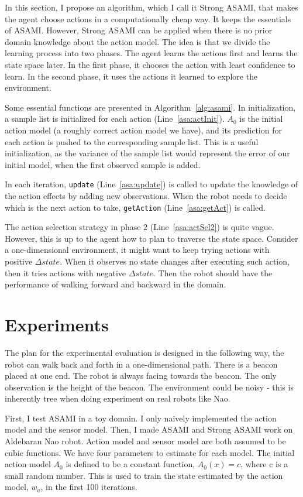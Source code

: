 \documentclass[10pt]{article}
\begin{document}
In this section, I propose an algorithm, which I call it Strong ASAMI,
that makes the agent choose actions in a computationally cheap way.
It keeps the essentials of ASAMI\@. However, Strong ASAMI can be applied
when there is no prior domain knowledge about the action model. The
idea is that we divide the learning process into two phases. The agent
learns the actions first and learns the state space later. In the
first phase, it chooses the action with least confidence to learn. In
the second phase, it uses the actions it learned to explore the
environment.

Some essential functions are presented in Algorithm~\ref{alg:asami}.
In initialization, a sample list is initialized for each action
(Line~\ref{asa:actInit}). $A_0$ is the initial action model (a roughly
correct action model we have), and its prediction for each action is
pushed to the corresponding sample list.  This is a useful
initialization, as the variance of the sample list would represent
the error of our initial model, when the first observed sample is
added.

In each iteration, \texttt{update} (Line~\ref{asa:update}) is called to update
the knowledge of the action effects by adding new observations. When
the robot needs to decide which is the next action to take,
\texttt{getAction} (Line~\ref{asa:getAct}) is called.

The action selection strategy in phase 2 (Line~\ref{asa:actSel2}) is
quite vague. However, this is up to the agent how to plan to traverse
the state space. Consider a one-dimensional environment, it might want
to keep trying actions with positive $\Delta state$. When it observes
no state changes after executing such action, then it tries actions
with negative $\Delta state$. Then the robot should have the
performance of walking forward and backward in the domain.

\section{Experiments}

The plan for the experimental evaluation is designed in the following
way, the robot can walk back and forth in a one-dimensional path.
There is a beacon placed at one end. The robot is always facing
towards the beacon. The only observation is the height of the beacon.
The environment could be noisy - this is inherently tree when doing
experiment on real robots like Nao.

First, I test ASAMI in a toy domain. I only naively implemented the action
model and the sensor model. Then, I made ASAMI and Strong ASAMI work on
Aldebaran Nao robot. Action model and sensor model are both assumed to be cubic
functions.  We have four parameters to estimate for each model. The
initial action model $A_0$ is defined to be a constant function,
$A_0(x) = c$, where c is a small random number. This is used to train
the state estimated by the action model, $w_a$, in the first 100
iterations.
\end{document}
